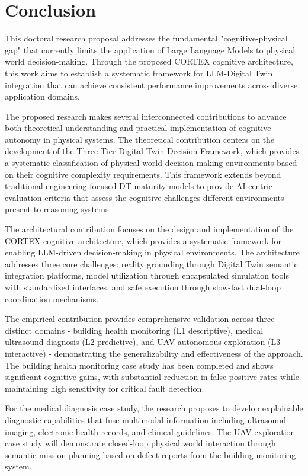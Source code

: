 
\chapter{Conclusion} \label{chp:conclusion}

This doctoral research proposal addresses the fundamental "cognitive-physical gap" that currently limits the application of Large Language Models to physical world decision-making. Through the proposed CORTEX cognitive architecture, this work aims to establish a systematic framework for LLM-Digital Twin integration that can achieve consistent performance improvements across diverse application domains.

The proposed research makes several interconnected contributions to advance both theoretical understanding and practical implementation of cognitive autonomy in physical systems. The theoretical contribution centers on the development of the Three-Tier Digital Twin Decision Framework, which provides a systematic classification of physical world decision-making environments based on their cognitive complexity requirements. This framework extends beyond traditional engineering-focused DT maturity models to provide AI-centric evaluation criteria that assess the cognitive challenges different environments present to reasoning systems.

The architectural contribution focuses on the design and implementation of the CORTEX cognitive architecture, which provides a systematic framework for enabling LLM-driven decision-making in physical environments. The architecture addresses three core challenges: reality grounding through Digital Twin semantic integration platforms, model utilization through encapsulated simulation tools with standardized interfaces, and safe execution through slow-fast dual-loop coordination mechanisms.

The empirical contribution provides comprehensive validation across three distinct domains - building health monitoring (L1 descriptive), medical ultrasound diagnosis (L2 predictive), and UAV autonomous exploration (L3 interactive) - demonstrating the generalizability and effectiveness of the approach. The building health monitoring case study has been completed and shows significant cognitive gains, with substantial reduction in false positive rates while maintaining high sensitivity for critical fault detection.

For the medical diagnosis case study, the research proposes to develop explainable diagnostic capabilities that fuse multimodal information including ultrasound imaging, electronic health records, and clinical guidelines. The UAV exploration case study will demonstrate closed-loop physical world interaction through semantic mission planning based on defect reports from the building monitoring system.

